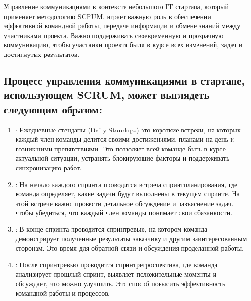 \documentclass[letterpaper,10pt,russian]{sphinxmanual}
\begin{document}
\sphinxAtStartPar
Управление коммуникациями в контексте небольшого IT стартапа, который применяет методологию SCRUM, играет важную роль в обеспечении эффективной командной работы, передаче информации и обмене знаний между участниками проекта. Важно поддерживать своевременную и прозрачную коммуникацию, чтобы участники проекта были в курсе всех изменений, задач и достигнутых результатов.


\subsection{Процесс управления коммуникациями в стартапе, использующем SCRUM, может выглядеть следующим образом:}
\label{\detokenize{educational_materials/team_work_on_a_project/content:id11}}\begin{enumerate}
%
\item {} 
\sphinxAtStartPar
{}:
Ежедневные стендапы (Daily Stand\sphinxhyphen{}ups) \sphinxhyphen{} это короткие встречи, на которых каждый член команды делится своими достижениями, планами на день и возникшими препятствиями. Это позволяет всей команде быть в курсе актуальной ситуации, устранять блокирующие факторы и поддерживать синхронизацию работ.

\item {} 
\sphinxAtStartPar
{}:
На начало каждого спринта проводится встреча спринт\sphinxhyphen{}планирования, где команда определяет, какие задачи будут выполнены в текущем спринте. На этой встрече важно провести детальное обсуждение и разъяснение задач, чтобы убедиться, что каждый член команды понимает свои обязанности.

\item {} 
\sphinxAtStartPar
{}:
В конце спринта проводится спринт\sphinxhyphen{}ревью, на котором команда демонстрирует полученные результаты заказчику и другим заинтересованным сторонам. Это время для обратной связи и обсуждения проделанной работы.

\item {} 
\sphinxAtStartPar
{}:
После спринт\sphinxhyphen{}ревью проводится спринт\sphinxhyphen{}ретроспектива, где команда анализирует прошлый спринт, выявляет положительные моменты и обсуждает, что можно улучшить. Это способ повысить эффективность командной работы и процессов.


\end{enumerate}
\end{document}
